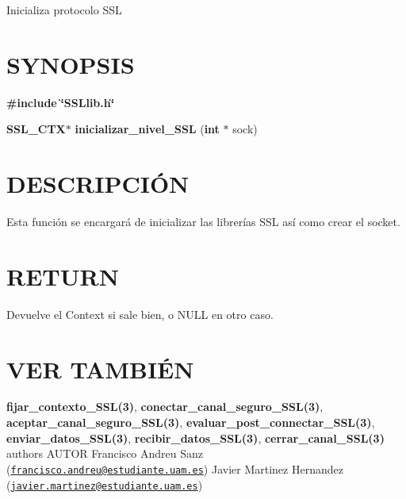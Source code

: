 Inicializa protocolo S\-S\-L\hypertarget{unknown_case_SYNOPSIS}{}\section{S\-Y\-N\-O\-P\-S\-I\-S}\label{unknown_case_SYNOPSIS}
{\bfseries \#include} {\bfseries \char`\"{}\-S\-S\-Llib.\-h\char`\"{}} 

{\bfseries S\-S\-L\-\_\-\-C\-T\-X$\ast$} {\bfseries inicializar\-\_\-nivel\-\_\-\-S\-S\-L} {\bfseries }({\bfseries int} $\ast$ sock{\bfseries })\hypertarget{unknown_case_descripcion}{}\section{D\-E\-S\-C\-R\-I\-P\-C\-IÓ\-N}\label{unknown_case_descripcion}
Esta función se encargará de inicializar las librerías S\-S\-L así como crear el socket.\hypertarget{cerrar_canal_SSL_return}{}\section{R\-E\-T\-U\-R\-N}\label{cerrar_canal_SSL_return}
Devuelve el Context si sale bien, o N\-U\-L\-L en otro caso.\hypertarget{unknown_case_seealso}{}\section{V\-E\-R T\-A\-M\-B\-IÉ\-N}\label{unknown_case_seealso}
{\bfseries fijar\-\_\-contexto\-\_\-\-S\-S\-L(3)}, {\bfseries conectar\-\_\-canal\-\_\-seguro\-\_\-\-S\-S\-L(3)}, {\bfseries aceptar\-\_\-canal\-\_\-seguro\-\_\-\-S\-S\-L(3)}, {\bfseries evaluar\-\_\-post\-\_\-connectar\-\_\-\-S\-S\-L(3)}, {\bfseries enviar\-\_\-datos\-\_\-\-S\-S\-L(3)}, {\bfseries recibir\-\_\-datos\-\_\-\-S\-S\-L(3)}, {\bfseries cerrar\-\_\-canal\-\_\-\-S\-S\-L(3)} {\bfseries }  authors A\-U\-T\-O\-R Francisco Andreu Sanz (\href{mailto:francisco.andreu@estudiante.uam.es}{\tt francisco.\-andreu@estudiante.\-uam.\-es}) Javier Martinez Hernandez (\href{mailto:javier.martinez@estudiante.uam.es}{\tt javier.\-martinez@estudiante.\-uam.\-es}) 